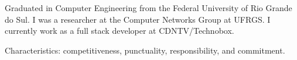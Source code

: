 

\begin{cvparagraph}

Graduated in Computer Engineering from the Federal University of Rio Grande do Sul. I was a researcher at the Computer Networks Group at UFRGS. I currently work as a full stack developer at CDNTV/Technobox.


Characteristics: competitiveness, punctuality, responsibility, and commitment.
\end{cvparagraph}
